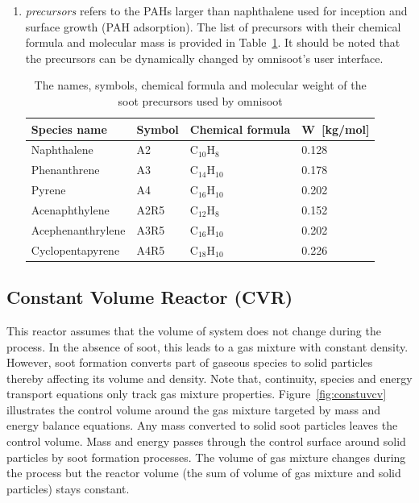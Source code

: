 \begin{enumerate}
\item \textit{precursors} refers to the PAHs larger than naphthalene used for inception and surface growth (PAH adsorption). The list of precursors with their chemical formula and molecular mass is provided in Table~\ref{tab:precursors_list}. It should be noted that the precursors can be dynamically changed by omnisoot's user interface.

\begin{table}
	\caption{The names, symbols, chemical formula and molecular weight of the soot precursors used by omnisoot}
	\label{tab:precursors_list}
	\centering
	\begin{tabular}{l l l l}
		\hline
		Species name & Symbol & Chemical formula & W~[kg/mol] \\
		\hline
		Naphthalene       & A2   &  $\mathrm{C_{10}H_{8}}$   & 0.128 \\
		Phenanthrene      & A3   &  $\mathrm{C_{14}H_{10}}$  & 0.178 \\
		Pyrene            & A4   &  $\mathrm{C_{16}H_{10}}$  & 0.202 \\
		Acenaphthylene    & A2R5 &  $\mathrm{C_{12}H_{8}}$   & 0.152 \\
		Acephenanthrylene & A3R5 &  $\mathrm{C_{16}H_{10}}$  & 0.202 \\
		Cyclopentapyrene  & A4R5 &  $\mathrm{C_{18}H_{10}}$  & 0.226 \\
		\hline
	\end{tabular}
\end{table}

\end{enumerate}


\subsection{Constant Volume Reactor (CVR)}
This reactor assumes that the volume of system does not change during the process. In the absence of soot, this leads to a gas mixture with constant density. However, soot formation converts part of gaseous species to solid particles thereby affecting its volume and density. Note that, continuity, species and energy transport equations only track gas mixture properties. Figure~\ref{fig:constuvcv} illustrates the control volume around the gas mixture targeted by mass and energy balance equations. Any mass converted to solid soot particles leaves the control volume. Mass and energy passes through the control surface around solid particles by soot formation processes. The volume of gas mixture changes during the process but the reactor volume (the sum of volume of gas mixture and solid particles) stays constant.

